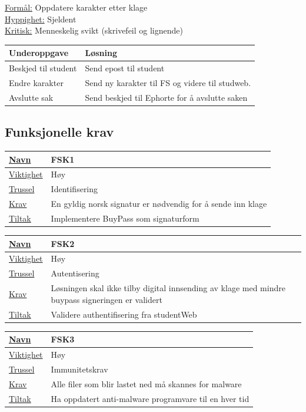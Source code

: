 \documentclass[12pt]{article}
\begin{document}
\underline{Formål:} Oppdatere karakter etter klage\\
\underline{Hyppighet:} Sjeldent\\
\underline{Kritisk:} Menneskelig svikt (skrivefeil og lignende)

\begin{tabularx}{\textwidth}{|l|X|}
  \hline
  Underoppgave & Løsning \\ \hline
  Beskjed til student & Send epost til student \\ \hline
  Endre karakter & Send ny karakter til FS og videre til studweb. \\ \hline
  Avslutte sak & Send beskjed til Ephorte for å avslutte saken \\ \hline
\end{tabularx}


\subsection{Funksjonelle krav}
\begin{tabularx}{\textwidth}{|l|X|}
  \hline
  \underline{Navn} & FSK1 \\ \hline
  \underline{Viktighet} & Høy \\ \hline
  \underline{Trussel} & Identifisering \\ \hline
  \underline{Krav} & En gyldig norsk signatur er nødvendig for å sende inn klage \\ \hline
  \underline{Tiltak} & Implementere BuyPass som signaturform \\ \hline
\end{tabularx}

\begin{tabularx}{\textwidth}{|l|X|}
  \hline
  \underline{Navn} & FSK2 \\ \hline
  \underline{Viktighet} & Høy \\ \hline
  \underline{Trussel} & Autentisering \\ \hline
  \underline{Krav} & Løsningen skal ikke tilby digital innsending av klage med mindre buypass signeringen er validert \\ \hline
  \underline{Tiltak} & Validere authentifisering fra studentWeb \\ \hline
\end{tabularx}

\begin{tabularx}{\textwidth}{|l|X|}
  \hline
  \underline{Navn} & FSK3 \\ \hline
  \underline{Viktighet} & Høy \\ \hline
  \underline{Trussel} & Immunitetskrav \\ \hline
  \underline{Krav} & Alle filer som blir lastet ned må skannes for malware \\ \hline
  \underline{Tiltak} & Ha oppdatert anti-malware programvare til en hver tid \\ \hline
\end{tabularx}
\end{document}
